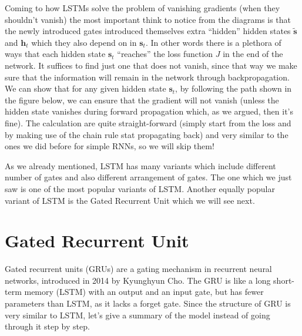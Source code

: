 Coming to how LSTMs solve the problem of vanishing gradients (when they shouldn't vanish) the most important think to
notice from the diagrams is that the newly introduced gates introduced themselves extra ``hidden'' hidden states
$\boldsymbol{\tilde{s}}$ and $\boldsymbol{h}_{t}$ which they also depend on in $\boldsymbol{s}_{t}$. In other words
there is a plethora of ways that each hidden state $\boldsymbol{s}_{t}$ ``reaches'' the loss function $J$ in the end of
the
network. It suffices to find just one that does not vanish, since that way we make sure that the information will
remain in the network through backpropagation. We can show that for any given hidden state $\boldsymbol{s}_{t}$, by
following the path shown in the figure below, we can ensure that the gradient will not vanish (unless the hidden state
vanishes during forward propagation which, as we argued, then it's fine). The calculation are quite straight-forward
(simply start from the loss and by making use of the chain rule stat propagating back) and very similar to the ones
we did before for simple RNNs, so we will skip them!


As we already mentioned, LSTM has many variants which include different number of gates and also different arrangement
of gates. The one which we just saw is one of the most popular variants of LSTM. Another equally popular variant of
LSTM is the Gated Recurrent Unit which we will see next.

\section{Gated Recurrent Unit}

Gated recurrent units (GRUs) are a gating mechanism in recurrent neural networks, introduced in 2014 by Kyunghyun Cho.
The GRU is like a long short-term memory (LSTM) with an output and an input gate, but has fewer parameters than
LSTM, as it lacks a forget gate. Since the structure of GRU is very similar to LSTM, let's give a summary of the
model instead of going through it step by step.

